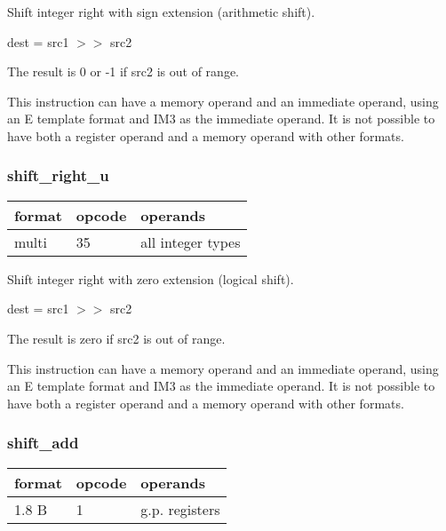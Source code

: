 \documentclass[forwardcom.tex]{subfiles}
\begin{document}
Shift integer right with sign extension (arithmetic shift).

dest = src1 $>>$ src2
\vspace{2mm}

The result is 0 or -1 if src2 is out of range.
\vspace{2mm}

This instruction can have a memory operand and an immediate operand, using an E template format and IM3 as the immediate operand. It is not possible to have both a register operand and a memory operand with other formats.
\vspace{2mm}

\subsubsection{shift\_right\_u}
\label{table:shiftRightUInstruction}
\begin{tabular}{|p{12mm}|p{12mm}|p{110mm}|}
\hline
\bfseries format & \bfseries opcode & \bfseries operands \\ \hline
multi & 35 & all integer types \\ \hline
\end{tabular}
\vspace{2mm}

Shift integer right with zero extension (logical shift).

dest = src1 $>>$ src2
\vspace{2mm}

The result is zero if src2 is out of range.
\vspace{2mm}

This instruction can have a memory operand and an immediate operand, using an E template format and IM3 as the immediate operand. It is not possible to have both a register operand and a memory operand with other formats.
\vspace{2mm}

\subsubsection{shift\_add}
\label{table:shiftAddInstruction}
\begin{tabular}{|p{12mm}|p{12mm}|p{110mm}|}
\hline
\bfseries format & \bfseries opcode & \bfseries operands \\ \hline
1.8 B &  1 & g.p. registers \\ \hline
\end{tabular}
\vspace{2mm}
\end{document}
